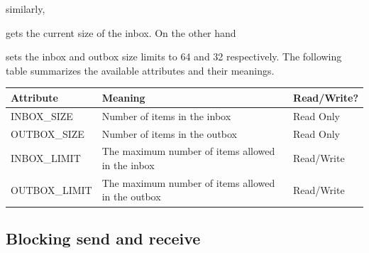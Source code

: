 
\noindent similarly, 


\noindent
gets the current size of the inbox. On the other hand

sets the inbox and outbox size limits to 64 and 32 respectively. The following
table summarizes the available attributes and their meanings.


\begin{flushleft}
\begin{tabular}{p{1.6in} p{2.8in} p{1.5in}}
 Attribute & Meaning & Read/Write?\\
\hline
INBOX\_SIZE &
Number of items in the inbox &
Read Only\\
OUTBOX\_SIZE &
Number of items in the outbox &
Read Only\\
INBOX\_LIMIT &
The maximum number of items allowed in the inbox &
Read/Write\\
OUTBOX\_LIMIT &
The maximum number of items allowed in the outbox &
Read/Write\\
\end{tabular}
\end{flushleft}

\subsection*{Blocking send and receive}

